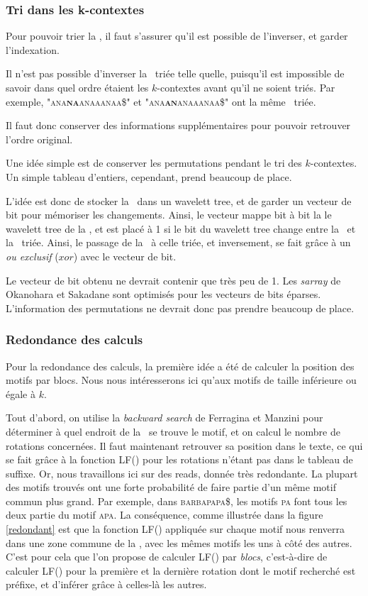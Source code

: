 \subsubsection{Tri dans les k-contextes}
Pour pouvoir trier la \kbwt, il faut s'assurer qu'il est possible de l'inverser, et garder l'indexation.

Il n'est pas possible d'inverser la \kbwt\ triée telle quelle, puisqu'il est impossible de savoir dans quel ordre étaient les $k$-contextes avant qu'il ne soient triés. Par exemple, \textsc{"ana\textbf{na}anaaanaa\$"} et \textsc{"ana\textbf{an}anaaanaa\$"} ont la même \kbwt\ triée.

Il faut donc conserver des informations supplémentaires pour pouvoir retrouver l'ordre original.

Une idée simple est de conserver les permutations pendant le tri des $k$-contextes. Un simple tableau d'entiers, cependant, prend beaucoup de place.

L'idée est donc de stocker la \kbwt\ dans un wavelett tree, et de garder un vecteur de bit pour mémoriser les changements. Ainsi, le vecteur mappe bit à bit la le wavelett tree de la \kbwt, et est placé à 1 si le bit du wavelett tree change entre la \kbwt\ et la \kbwt\ triée. Ainsi, le passage de la \kbwt\ à celle triée, et inversement, se fait grâce à un \textit{ou exclusif} ($xor$) avec le vecteur de bit.

Le vecteur de bit obtenu ne devrait contenir que très peu de 1. Les \textit{sarray} de Okanohara et Sakadane sont optimisés pour les vecteurs de bits éparses. L'information des permutations ne devrait donc pas prendre beaucoup de place.

\subsubsection{Redondance des calculs}
Pour la redondance des calculs, la première idée a été de calculer la position des motifs par blocs. Nous nous intéresserons ici qu'aux motifs de taille inférieure ou égale à $k$. 

Tout d'abord, on utilise la \textit{backward search} de Ferragina et Manzini pour déterminer à quel endroit de la \kbwt\ se trouve le motif, et on calcul le nombre de rotations concernées. Il faut maintenant retrouver sa position dans le texte, ce qui se fait grâce à la fonction LF() pour les rotations n'étant pas dans le tableau de suffixe. Or, nous travaillons ici sur des reads, donnée très redondante. La plupart des motifs trouvés ont une forte probabilité de faire partie d'un même motif commun plus grand. Par exemple, dans \textsc{barbapapa\$}, les motifs \textsc{pa} font tous les deux partie du motif \textsc{apa}. La conséquence, comme illustrée dans la figure \ref{redondant} est que la fonction LF() appliquée sur chaque motif nous renverra dans une zone commune de la \kbwt, avec les mêmes motifs les uns à côté des autres. C'est pour cela que l'on propose de calculer LF() par \textit{blocs}, c'est-à-dire de calculer LF() pour la première et la dernière rotation dont le motif recherché est préfixe, et d'inférer grâce à celles-là les autres.




